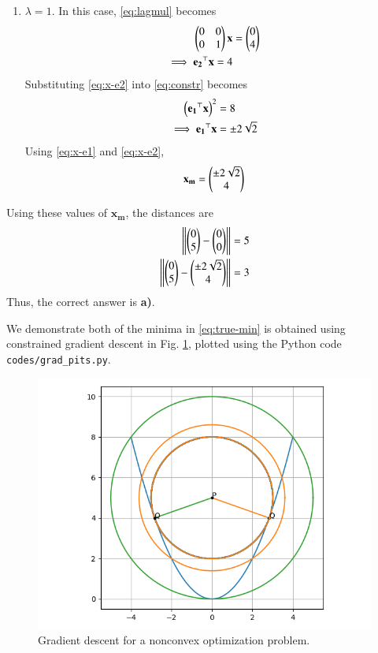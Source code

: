 \documentclass[journal,12pt,twocolumn]{IEEEtran}
\renewcommand{\vec}[1]{\boldsymbol{\mathbf{#1}}}
\begin{document}
\begin{enumerate}
\begin{enumerate}
        \item $\lambda = 1$. In this case, \eqref{eq:lagmul} becomes
        \begin{align}
            \myvec{0&0\\0&1}\vec{x} &= \myvec{0\\4} \\
            \implies \vec{e_2}^\top\vec{x} = 4
            \label{eq:x-e2}
        \end{align}
        Substituting \eqref{eq:x-e2} into \eqref{eq:constr} becomes
        \begin{align}
            \brak{\vec{e_1}^\top\vec{x}}^2 &= 8 \\
            \implies \vec{e_1}^\top\vec{x} &= \pm 2\sqrt{2}
            \label{eq:x-e1}
        \end{align}
        Using \eqref{eq:x-e1} and \eqref{eq:x-e2},
        \begin{align}
            \vec{x_m} = \myvec{\pm 2\sqrt{2}\\4}
        \end{align}
    \end{enumerate}
    Using these values of $\vec{x_m}$, the distances are
    \begin{align}
        \left\Vert\begin{pmatrix}0\\5\end{pmatrix}-\begin{pmatrix}0\\0\end{pmatrix}\right\Vert &= 5 \\
        \left\Vert\begin{pmatrix}0\\5\end{pmatrix}-\begin{pmatrix}\pm 2\sqrt{2}\\4\end{pmatrix}\right\Vert &= 3
        \label{eq:true-min}
    \end{align}
    Thus, the correct answer is \textbf{a)}.

    We demonstrate both of the minima in \eqref{eq:true-min} is obtained using 
    constrained gradient descent in Fig. \ref{fig:gd-pits}, plotted using the 
    Python code \texttt{codes/grad\_pits.py}.
    \begin{figure}[!ht]
        \centering
        \includegraphics[width=\columnwidth]{figs/grad_pits.png}
        \caption{Gradient descent for a nonconvex optimization problem.}
        \label{fig:gd-pits}
    \end{figure}
\end{enumerate}
\end{document}
